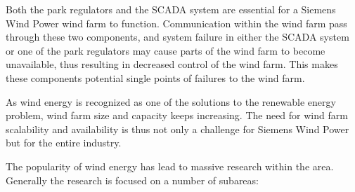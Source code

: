 
Both the park regulators and the SCADA system are essential for a Siemens Wind Power wind farm to function. Communication within the wind farm pass through these two components, and system failure in either the SCADA system or one of the park regulators may cause parts of the wind farm to become unavailable, thus resulting in decreased control of the wind farm. This makes these components potential single points of failures to the wind farm. 


As wind energy is recognized as one of the solutions to the renewable energy problem, wind farm size and capacity keeps increasing.
The need for wind farm scalability and availability is thus not only a challenge for Siemens Wind Power but for the entire industry.

The popularity of wind energy has lead to massive research within the area. Generally the research is focused on a number of subareas:

